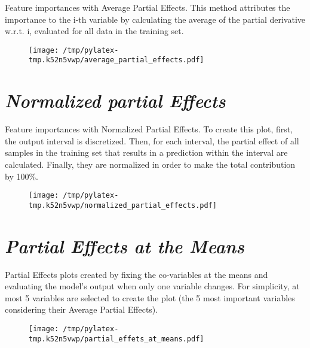 \documentclass{article}%
\begin{document}
                Feature importances with Average Partial Effects. This method
                attributes the importance to the i-th variable by calculating
                the average of the partial derivative w.r.t. i, evaluated for
                all data in the training set.

                \vfill%


\begin{figure}[H]%
\centering%
\texttt{[image: /tmp/pylatex-tmp.k52n5vwp/average\_partial\_effects.pdf]}%
\end{figure}

%
\vfill \pagebreak

%
\section*{\textit{Normalized partial Effects}}%
\label{sec:textitNormalizedpartialEffects}%

                Feature importances with Normalized Partial Effects. 
                To create this plot, first, the output interval is discretized.
                Then, for each interval, the partial effect of all samples
                in the training set that results in a prediction within the
                interval are calculated. Finally, they are normalized in
                order to make the total contribution by 100\%.

                \vfill%


\begin{figure}[H]%
\centering%
\texttt{[image: /tmp/pylatex-tmp.k52n5vwp/normalized\_partial\_effects.pdf]}%
\end{figure}

%
\vfill \pagebreak

%
\section*{\textit{Partial Effects at the Means}}%
\label{sec:textitPartialEffectsattheMeans}%

                Partial Effects plots created by fixing the co-variables at
                the means and evaluating the model's output when only one
                variable changes. For simplicity, at most 5 variables are
                selected to create the plot (the 5 most important variables
                considering their Average Partial Effects).

                \vfill%


\begin{figure}[H]%
\centering%
\texttt{[image: /tmp/pylatex-tmp.k52n5vwp/partial\_effets\_at\_means.pdf]}%
\end{figure}

%
\vfill \pagebreak

%
\end{document}
